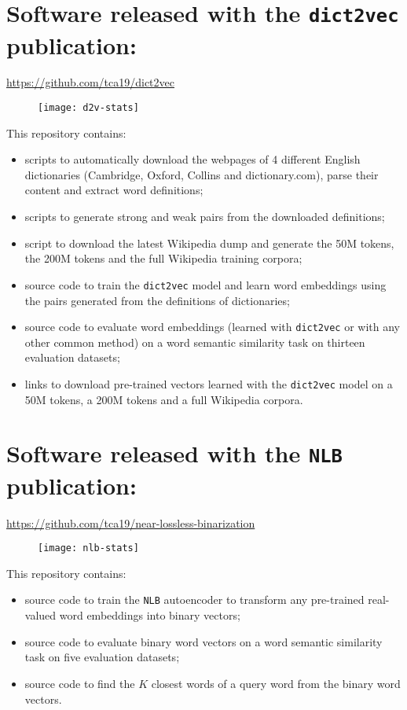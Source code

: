 
\section*{Software released with the \texttt{dict2vec} publication:}
  \url{https://github.com/tca19/dict2vec}

  \begin{figure}[h]
    \texttt{[image: d2v-stats]}
  \end{figure}

  \noindent This repository contains:

  \begin{itemize}
    \item scripts to automatically download the webpages of 4 different English
      dictionaries (Cambridge, Oxford, Collins and dictionary.com), parse their
      content and extract word definitions;
    \item scripts to generate strong and weak pairs from the downloaded
      definitions;
    \item script to download the latest Wikipedia dump and generate the 50M
      tokens, the 200M tokens and the full Wikipedia training corpora;
    \item source code to train the \texttt{dict2vec} model and learn word
      embeddings using the pairs generated from the definitions of dictionaries;
    \item source code to evaluate word embeddings (learned with
      \texttt{dict2vec} or with any other common method) on a word semantic
      similarity task on thirteen evaluation datasets;
    \item links to download pre-trained vectors learned with the
      \texttt{dict2vec} model on a 50M tokens, a 200M tokens and a full
      Wikipedia corpora.
  \end{itemize}

\section*{Software released with the \texttt{NLB} publication:}
  \url{https://github.com/tca19/near-lossless-binarization}

  \begin{figure}[h]
    \texttt{[image: nlb-stats]}
  \end{figure}

  \noindent This repository contains:

  \begin{itemize}
    \item source code to train the \texttt{NLB} autoencoder to transform any
      pre-trained real-valued word embeddings into binary vectors;
    \item source code to evaluate binary word vectors on a word semantic
      similarity task on five evaluation datasets;
    \item source code to find the $K$ closest words of a query word from the
      binary word vectors.
  \end{itemize}
